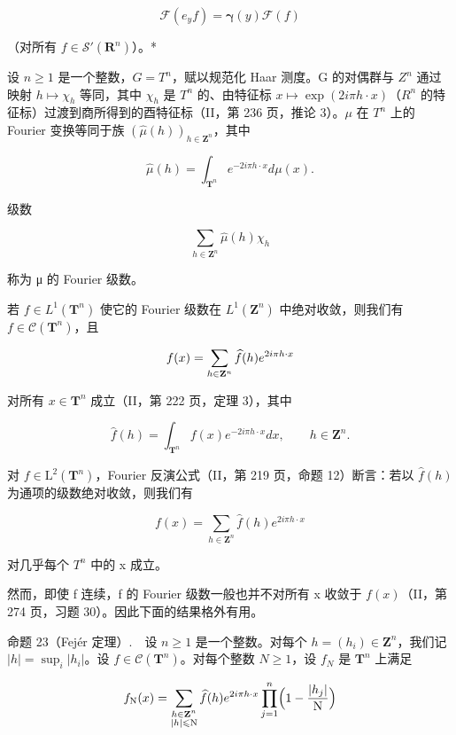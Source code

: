 \[
\mathcal {F} (e _ {y} f) = \boldsymbol {\gamma} (y) \mathcal {F} (f)
\]

（对所有 \(f \in \mathcal{S}'(\mathbf{R}^n)\)）。*

设 \(n \geqslant 1\) 是一个整数，\(G = T^{n}\)，赋以规范化 Haar 测度。G 的对偶群与 \(Z^{n}\) 通过映射 \(h \mapsto \chi_{h}\) 等同，其中 \(\chi_{h}\) 是 \(T^{n}\) 的、由特征标 \(x \mapsto \exp(2i\pi h \cdot x)\)（\(R^{n}\) 的特征标）过渡到商所得到的酉特征标（II，第 236 页，推论 3）。\(\mu\) 在 \(T^{n}\) 上的 Fourier 变换等同于族 \((\widehat{\mu}(h))_{h \in \mathbf{Z}^{n}}\)，其中

\[
\widehat {\mu} (h) = \int_ {\mathbf {T} ^ {n}} e ^ {- 2 i \pi h \cdot x} d \mu (x).
\]

级数

\[
\sum_ {h \in \mathbf {Z} ^ {n}} \widehat {\mu} (h) \chi_ {h}
\]

称为 μ 的 Fourier 级数。

若 \(f \in L^{1}(\mathbf{T}^{n})\) 使它的 Fourier 级数在 \(L^{1}(\mathbf{Z}^{n})\) 中绝对收敛，则我们有 \(f \in \mathcal{C}(\mathbf{T}^{n})\)，且

\[
f (x) = \sum_ {h \in {\bf Z} ^ {n}} \widehat {f} (h) e ^ {2 i \pi h \cdot x}
\]

对所有 \(x \in \mathbf{T}^n\) 成立（II，第 222 页，定理 3），其中

\[
\widehat {f} (h) = \int_ {\mathbf {T} ^ {n}} f (x) e ^ {- 2 i \pi h \cdot x} d x, \qquad h \in \mathbf {Z} ^ {n}.
\]

对 \(f \in \mathrm{L}^2(\mathbf{T}^n)\)，Fourier 反演公式（II，第 219 页，命题 12）断言：若以 \(\widehat{f}(h)\) 为通项的级数绝对收敛，则我们有

\[
f (x) = \sum_ {h \in \mathbf {Z} ^ {n}} \widehat {f} (h) e ^ {2 i \pi h \cdot x}
\]

对几乎每个 \(T^{n}\) 中的 x 成立。

然而，即使 f 连续，f 的 Fourier 级数一般也并不对所有 x 收敛于 \(f(x)\)（II，第 274 页，习题 30）。因此下面的结果格外有用。

命题 23（Fejér 定理）.　设 \(n \geqslant 1\) 是一个整数。对每个 \(h = (h_i) \in \mathbf{Z}^n\)，我们记 \(|h| = \sup_i |h_i|\)。设 \(f \in \mathcal{C}(\mathbf{T}^n)\)。对每个整数 \(N \geqslant 1\)，设 \(f_N\) 是 \(\mathbf{T}^n\) 上满足

\[
f_{\mathrm{N}}(x) = \sum_{\substack{h\in \mathbf{Z}^{n}\\ |h|\leqslant \mathrm{N}}}\widehat{f} (h)e^{2i\pi h\cdot x}\prod_{j = 1}^{n}\Bigl (1 - \frac{|h_{j}|}{\mathrm{N}}\Bigr)
\]

